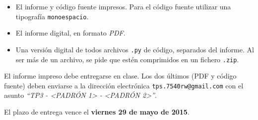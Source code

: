 \documentclass[12pt,spanish,]{article}
\begin{document}
\begin{itemize}
\item
  El informe y código fuente impresos. Para el código fuente utilizar
  una tipografía \texttt{monoespacio}.
\item
  El informe digital, en formato \emph{PDF}.
\item
  Una versión digital de todos archivos \texttt{.py} de código,
  separados del informe. Al ser más de un archivo, se pide que estén
  comprimidos en un fichero \texttt{.zip}.
\end{itemize}

El informe impreso debe entregarse en clase. Los dos últimos (PDF y
código fuente) deben enviarse a la dirección electrónica
\texttt{tps.7540rw@gmail.com} con el asunto \emph{``TP3 -
\textless{}PADRÓN 1\textgreater{} - \textless{}PADRÓN
2\textgreater{}''}.

El plazo de entrega vence el \textbf{viernes 29 de mayo de 2015}.
\end{document}
